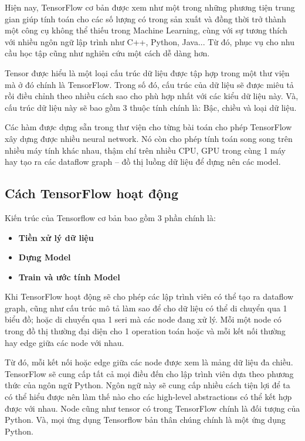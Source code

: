 Hiện nay, TensorFlow cơ bản được xem như một trong những phương tiện trung gian giúp tính toán cho các số lượng có trong sản xuất và đồng thời trở 
thành một công cụ không thể thiếu trong Machine Learning, cùng với sự tương thích với nhiều ngôn ngữ lập trình như C++, Python, Java... 
Từ đó, phục vụ cho nhu cầu học tập cũng như nghiên cứu một cách dễ dàng hơn. 

Tensor được hiểu là một loại cấu trúc dữ liệu được tập hợp 
trong một thư viện mà ở đó chính là TensorFlow. Trong số đó, cấu trúc của dữ liệu sẽ được miêu tả rồi điều chỉnh theo nhiều cách sao cho phù hợp 
nhất với các kiểu dữ liệu này. Và, cấu trúc dữ liệu này sẽ bao gồm 3 thuộc tính chính là: Bậc, chiều và loại dữ liệu. 


Các hàm được dựng sẵn trong thư viện cho từng bài toán cho phép TensorFlow xây dựng được nhiều neural network. 
Nó còn cho phép tính toán song song trên nhiều máy tính khác nhau, thậm chí trên nhiều CPU, GPU trong cùng 1 máy hay tạo ra các dataflow graph – đồ 
thị luồng dữ liệu để dựng nên các model.






\subsection{Cách TensorFlow hoạt động}
Kiến trúc của Tensorflow cơ bản bao gồm 3 phần chính là: 
\begin{itemize}
\item \textbf{Tiền xử lý dữ liệu}
\item \textbf{Dựng Model}
\item  \textbf{Train và ước tính Model}
\end{itemize}

Khi TensorFlow hoạt động sẽ cho phép các lập trình viên có thể tạo ra dataflow graph, cũng như cấu trúc mô tả làm sao để cho dữ liệu có thể di chuyển 
qua 1 biểu đồ; hoặc di chuyển qua 1 seri mà các node đang xử lý. Mỗi một node có trong đồ thị thường đại diện cho 1 operation toán hoặc và mỗi kết nối 
thường hay edge giữa các node với nhau.

Từ đó, mỗi kết nối hoặc edge giữa các node được xem là mảng dữ liệu đa chiều. TensorFlow sẽ cung cấp tất cả mọi điều đến cho lập trình viên dựa theo 
phương thức của ngôn ngữ Python. Ngôn ngữ này sẽ cung cấp nhiều cách tiện lợi để ta có thể hiểu được nên làm thế nào cho các high-level abstractions 
có thể kết hợp được với nhau. Node cũng như tensor có trong TensorFlow chính là đối tượng của Python. Và, mọi ứng dụng Tensorflow bản thân chúng chính 
là một ứng dụng Python. 

